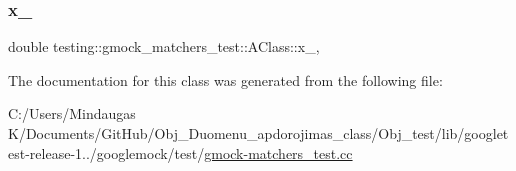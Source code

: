 \mbox{\label{classtesting_1_1gmock__matchers__test_1_1_a_class_a30c167756c720e1e793583006a9b3115}} 
\subsubsection{\texorpdfstring{x\_}{x\_}}
{\footnotesize\ttfamily double testing\+::gmock\+\_\+matchers\+\_\+test\+::\+A\+Class\+::x\+\_\+\hspace{0.3cm}{\ttfamily [static]}, {\ttfamily [private]}}



The documentation for this class was generated from the following file\+:\begin{DoxyCompactItemize}
\item 
C\+:/\+Users/\+Mindaugas K/\+Documents/\+Git\+Hub/\+Obj\+\_\+\+Duomenu\+\_\+apdorojimas\+\_\+class/\+Obj\+\_\+test/lib/googletest-\/release-\/1../googlemock/test/\mbox{\hyperlink{_obj__test_2lib_2googletest-release-1_88_81_2googlemock_2test_2gmock-matchers__test_8cc}{gmock-\/matchers\+\_\+test.\+cc}}\end{DoxyCompactItemize}
